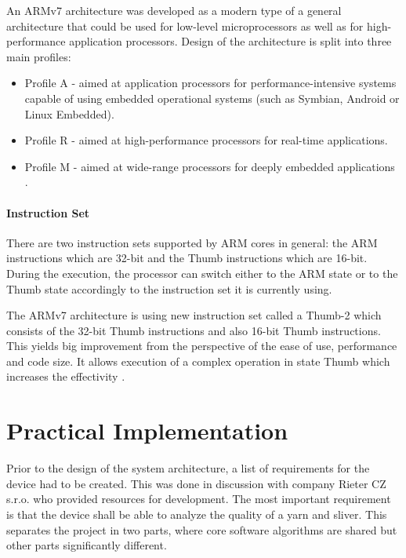 \documentclass[twoside]{ctuthesis}
\theoremstyle{plain}
\theoremstyle{definition}
\theoremstyle{note}
\begin{document}
An ARMv7 architecture was developed as a modern type of a general architecture that could be used for low-level microprocessors as well as for high-performance application processors. Design of the architecture is split into three main profiles:
\begin{itemize}
	\setlength{\itemsep}{5pt}
	\item Profile A - aimed at application processors for performance-intensive systems capable of using embedded operational systems (such as Symbian, Android or Linux Embedded).
	\item Profile R - aimed at high-performance processors for real-time applications.
	\item Profile M - aimed at wide-range processors for deeply embedded applications \cite{cite:ARM-M3}.
\end{itemize}

\subsubsection{Instruction Set}
There are two instruction sets supported by ARM cores in general: the ARM instructions which are 32-bit and the Thumb instructions which are 16-bit. During the execution, the processor can switch either to the ARM state or to the Thumb state accordingly to the instruction set it is currently using.

The ARMv7 architecture is using new instruction set called a Thumb-2 which consists of the 32-bit Thumb instructions and also 16-bit Thumb instructions. This yields big improvement from the perspective of the ease of use, performance and code size. It allows execution of a complex operation in state Thumb which increases the effectivity \cite{cite:ARM-M3}.

\chapter{Practical Implementation}
Prior to the design of the system architecture, a list of requirements for the device had to be created. This was done in discussion with company Rieter CZ s.r.o. who provided resources for development. The most important requirement is that the device shall be able to analyze the quality of a yarn and sliver. This separates the project in two parts, where core software algorithms are shared but other parts significantly different. 
\end{document}
